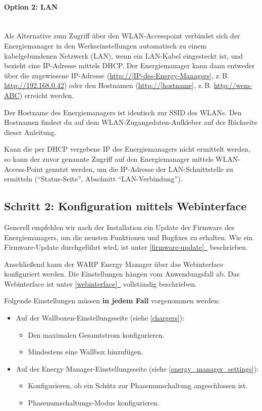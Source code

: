 \documentclass[a4paper,10pt]{article}
\newcommand*{\fullref}[1]{\hyperref[{#1}]{\ref*{#1}~\nameref*{#1}}}
\begin{document}
\begin{multicols*}{2}
	\paragraph{Option 2: LAN}\ \\
	Als Alternative zum Zugriff über den WLAN-Accesspoint verbindet sich der
	Energiemanager in den Werkseinstellungen automatisch zu einem
	kabelgebundenen Netzwerk (LAN), wenn ein LAN-Kabel eingesteckt ist, und bezieht eine IP-Adresse
	mittels DHCP. Der Energiemanager kann dann entweder über die zugewiesene IP-Adresse
	(\url{http://[IP-des-Energy-Managers]}, z.\,B. \url{http://192.168.0.42})
	oder den Hostnamen (\url{http://[hostname]}, z.\,B. \url{http://wem-ABC}) erreicht werden.

	Der Hostname des Energiemanagers ist identisch zur SSID des WLANs. Den Hostnamen findest du
	auf dem WLAN-Zugangsdaten-Aufkleber auf der Rückseite dieser Anleitung.

	Kann die per DHCP vergebene IP des Energiemanagers nicht ermittelt werden, so kann der
	zuvor genannte Zugriff auf den Energiemanager mittels WLAN-Access-Point genutzt
	werden, um die IP-Adresse der LAN-Schnittstelle zu ermitteln
	(\enquote{Status-Seite}, Abschnitt \enquote{LAN-Verbindung}).


	\subsection{Schritt 2: Konfiguration mittels Webinterface}
	Generell empfehlen wir nach der Installation ein Update der Firmware des
	Energiemanagers, um die neusten Funktionen und Bugfixes zu erhalten. Wie ein
	Firmware-Update durchgeführt wird, ist unter \fullref{firmware-update}
	beschrieben.

	Anschließend kann der WARP Energy Manager über das Webinterface konfiguriert
	werden. Die Einstellungen hängen vom Anwendungsfall ab.
	Das Webinterface ist unter \fullref{webinterface} vollständig beschrieben.

	Folgende Einstellungen müssen \textbf{in jedem Fall} vorgenommen werden:
	\begin{itemize}
	 \item Auf der Wallboxen-Einstellungsseite (siehe \ref{chargers}):
	 \begin{itemize}
		\item Den maximalen Gesamtstrom konfigurieren.
		\item Mindestens eine Wallbox hinzufügen.
	 \end{itemize}
	 \item Auf der Energy Manager-Einstellungsseite (siehe \ref{energy_manager_settings}):
	 \begin{itemize}
		\item Konfigurieren, ob ein Schütz zur Phasenumschaltung angeschlossen ist.
		\item Phasenumschaltungs-Modus konfigurieren.
	 \end{itemize}
	\end{itemize}


\end{multicols*}
\end{document}
